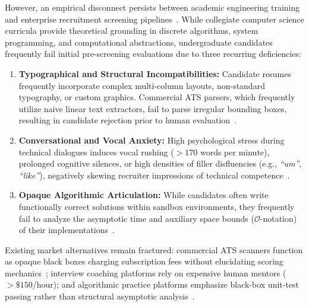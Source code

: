 \documentclass[conference]{IEEEtran}
\begin{document}
However, an empirical disconnect persists between academic engineering training and enterprise recruitment screening pipelines~\cite{paiva2022automated}. While collegiate computer science curricula provide theoretical grounding in discrete algorithms, system programming, and computational abstractions, undergraduate candidates frequently fail initial pre-screening evaluations due to three recurring deficiencies:
\begin{enumerate}
    \item \textbf{Typographical and Structural Incompatibilities:} Candidate resumes frequently incorporate complex multi-column layouts, non-standard typography, or custom graphics. Commercial ATS parsers, which frequently utilize naive linear text extractors, fail to parse irregular bounding boxes, resulting in candidate rejection prior to human evaluation~\cite{xu2020layoutlm}.
    \item \textbf{Conversational and Vocal Anxiety:} High psychological stress during technical dialogues induces vocal rushing ($> 170$ words per minute), prolonged cognitive silences, or high densities of filler disfluencies (e.g., \textit{``um''}, \textit{``like''}), negatively skewing recruiter impressions of technical competence~\cite{zhang2022acoustic}.
    \item \textbf{Opaque Algorithmic Articulation:} While candidates often write functionally correct solutions within sandbox environments, they frequently fail to analyze the asymptotic time and auxiliary space bounds ($\mathcal{O}$-notation) of their implementations~\cite{kumar2023evaluating}.
\end{enumerate}

Existing market alternatives remain fractured: commercial ATS scanners function as opaque black boxes charging subscription fees without elucidating scoring mechanics~\cite{oneil2021weapons}; interview coaching platforms rely on expensive human mentors ($>\$150$/hour); and algorithmic practice platforms emphasize black-box unit-test passing rather than structural asymptotic analysis~\cite{paiva2022automated}.
\end{document}

